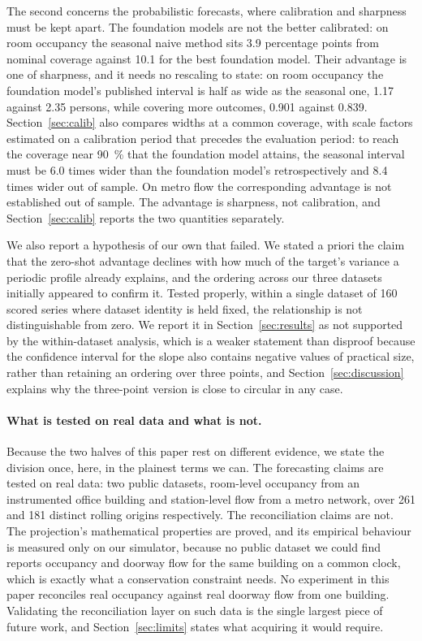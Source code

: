 \documentclass[utf8]{FrontiersinHarvard}
\newif\ifrevisionmarkup
\newcommand{\new}[1]{\ifrevisionmarkup\textcolor{revision}{#1}\else#1\fi}
\newif\ifsecondrevisionmarkup
\newcommand{\rev}[1]{\ifsecondrevisionmarkup\textcolor{revisiontwo}{#1}\else#1\fi}
\theoremstyle{plain}
\theoremstyle{definition}
\theoremstyle{remark}
\begin{document}
\new{The second \rev{concerns the probabilistic forecasts, where calibration and sharpness must be kept apart. The foundation models are not the better calibrated: on room occupancy the seasonal naive method sits \num{3.9} percentage points from nominal coverage against \num{10.1} for the best foundation model. Their advantage is one of sharpness, and it needs no rescaling to state: on room occupancy the foundation model's published interval is half as wide as the seasonal one, \num{1.17} against \num{2.35} persons, while covering more outcomes, \num{0.901} against \num{0.839}. Section~\ref{sec:calib} also compares widths at a common coverage, with scale factors estimated on a calibration period that precedes the evaluation period: to reach the coverage near \SI{90}{\percent} that the foundation model attains, the seasonal interval must be \num{6.0} times wider than the foundation model's retrospectively and \num{8.4} times wider out of sample. On metro flow the corresponding advantage is not established out of sample. The advantage is sharpness, not calibration, and Section~\ref{sec:calib} reports the two quantities separately.}}

We also report a hypothesis of our own that failed. We \new{stated a priori} the claim that the zero-shot advantage declines with how much of the target's variance a periodic profile already explains, and the ordering across our three datasets initially appeared to confirm it. Tested properly, within a single dataset of \num{160} scored series where dataset identity is held fixed, the relationship is not distinguishable from zero. \rev{We report it in Section~\ref{sec:results} as not supported by the within-dataset analysis, which is a weaker statement than disproof because the confidence interval for the slope also contains negative values of practical size,} rather than retaining an ordering over three points, and Section~\ref{sec:discussion} explains why \rev{the three-point version is} close to circular in any case.

\new{\paragraph{What is tested on real data and what is not.} Because the two halves of this paper rest on different evidence, we state the division once, here, in the plainest terms we can. The forecasting claims are tested on real data: two public datasets, room-level occupancy from an instrumented office building and station-level flow from a metro network, over \num{261} and \num{181} distinct rolling origins respectively. The reconciliation claims are not. The projection's mathematical properties are proved, and its empirical behaviour is measured only on our simulator, because no public dataset we could find reports occupancy and doorway flow for the same building on a common clock, which is exactly what a conservation constraint needs. No experiment in this paper reconciles real occupancy against real doorway flow from one building. Validating the reconciliation layer on such data is the single largest piece of future work, and Section~\ref{sec:limits} states what acquiring it would require.}
\end{document}
